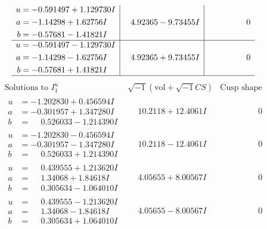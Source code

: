 \documentclass[1p]{elsarticle_modified}
\theoremstyle{definition}
\newcommand{\I}{\sqrt{-1}}
\begin{document}
$$\begin{array}{c|c|c}
\begin{aligned}
u &= -0.591497 + 1.129730 I \\
a &= -1.14298 + 1.62756 I \\
b &= -0.57681 - 1.41821 I\end{aligned}
 & \phantom{-}4.92365 - 9.73455 I & \phantom{-0.000000 } 0 \\ \hline\begin{aligned}
u &= -0.591497 - 1.129730 I \\
a &= -1.14298 - 1.62756 I \\
b &= -0.57681 + 1.41821 I\end{aligned}
 & \phantom{-}4.92365 + 9.73455 I & \phantom{-0.000000 } 0\\
 \hline 
 \end{array}$$\newpage$$\begin{array}{c|c|c}  
\text{Solutions to }I^u_{1}& \I (\text{vol} + \sqrt{-1}CS) & \text{Cusp shape}\\
 \hline 
\begin{aligned}
u &= -1.202830 + 0.456594 I \\
a &= -0.301957 + 1.347280 I \\
b &= \phantom{-}0.526033 - 1.214390 I\end{aligned}
 & \phantom{-}10.2118 + 12.4061 I & \phantom{-0.000000 } 0 \\ \hline\begin{aligned}
u &= -1.202830 - 0.456594 I \\
a &= -0.301957 - 1.347280 I \\
b &= \phantom{-}0.526033 + 1.214390 I\end{aligned}
 & \phantom{-}10.2118 - 12.4061 I & \phantom{-0.000000 } 0 \\ \hline\begin{aligned}
u &= \phantom{-}0.439555 + 1.213620 I \\
a &= \phantom{-}1.34068 + 1.84618 I \\
b &= \phantom{-}0.305634 - 1.064010 I\end{aligned}
 & \phantom{-}4.05655 + 8.00567 I & \phantom{-0.000000 } 0 \\ \hline\begin{aligned}
u &= \phantom{-}0.439555 - 1.213620 I \\
a &= \phantom{-}1.34068 - 1.84618 I \\
b &= \phantom{-}0.305634 + 1.064010 I\end{aligned}
 & \phantom{-}4.05655 - 8.00567 I & \phantom{-0.000000 } 0 \\ \hline\begin{aligned}

\end{aligned}
\end{array}$$
\end{document}
